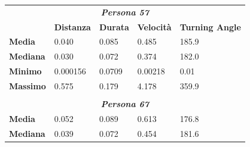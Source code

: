 \documentclass[12pt]{article}
\begin{document}
\begin{table}[!ht]
    \centering
    \begin{tabular}{|l|l|l|l|l|}
        \multicolumn{5}{c}{\textbf{\textit{Persona 57}}}                                                                                                                                             \\
        \cline{2-5}
        \multicolumn{1}{l|}{} & \multicolumn{1}{c|}{\textbf{Distanza}} & \multicolumn{1}{c|}{\textbf{Durata}} & \multicolumn{1}{c|}{\textbf{Velocità}} & \multicolumn{1}{c|}{\textbf{Turning Angle}} \\
        \hline
        \textbf{Media}        & 0.040                                  & 0.085                                & 0.485                                  & 185.9                                       \\
        \hline
        \textbf{Mediana}      & 0.030                                  & 0.072                                & 0.374                                  & 182.0                                       \\
        \hline
        \textbf{Minimo}       & 0.000156                               & 0.0709                               & 0.00218                                & 0.01                                        \\
        \hline
        \textbf{Massimo}      & 0.575                                  & 0.179                                & 4.178                                  & 359.9                                       \\
        \hline
        \multicolumn{1}{l}{}  & \multicolumn{1}{l}{}                   & \multicolumn{1}{l}{}                 & \multicolumn{1}{l}{}                   & \multicolumn{1}{l}{}                        \\
        \multicolumn{5}{c}{\textbf{\textit{Persona 67}}}                                                                                                                                             \\
        \hline
        \textbf{Media}        & 0.052                                  & 0.089                                & 0.613                                  & 176.8                                       \\
        \hline
        \textbf{Mediana}      & 0.039                                  & 0.072                                & 0.454                                  & 181.6                                       \\

\end{tabular}
\end{table}
\end{document}
